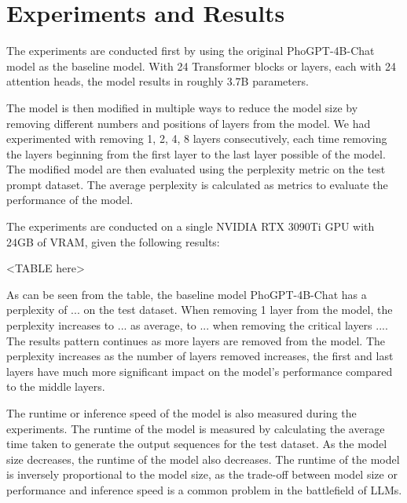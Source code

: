 \chapter{Experiments and Results}
The experiments are conducted first by using the original PhoGPT-4B-Chat model as the baseline model. With 24 Transformer blocks or layers, each with 24 attention heads, the model results in roughly 3.7B parameters.  \par
The model is then modified in multiple ways to reduce the model size by removing different numbers and positions of layers from the model. We had experimented with removing 1, 2, 4, 8 layers consecutively, each time removing the layers beginning from the first layer to the last layer possible of the model. The modified model are then evaluated using the perplexity metric on the test prompt dataset. The average perplexity is calculated as metrics to evaluate the performance of the model. \par
The experiments are conducted on a single NVIDIA RTX 3090Ti GPU with 24GB of VRAM, given the following results:

<TABLE here>

As can be seen from the table, the baseline model PhoGPT-4B-Chat has a perplexity of ... on the test dataset. When removing 1 layer from the model, the perplexity increases to ... as average, to ... when removing the critical layers .... The results pattern continues as more layers are removed from the model. The perplexity increases as the number of layers removed increases, the first and last layers have much more significant impact on the model's performance compared to the middle layers. \par
The runtime or inference speed of the model is also measured during the experiments. The runtime of the model is measured by calculating the average time taken to generate the output sequences for the test dataset. As the model size decreases, the runtime of the model also decreases. The runtime of the model is inversely proportional to the model size, as the trade-off between model size or performance and inference speed is a common problem in the battlefield of LLMs. \par